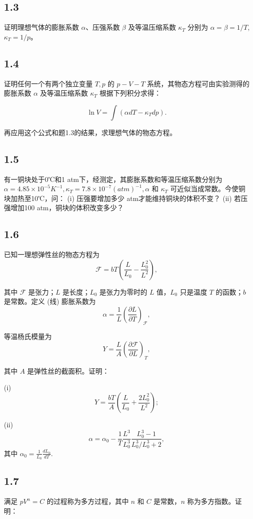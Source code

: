\newpage
\subsection{1.3}
证明理想气体的膨胀系数 $\alpha$、压强系数 $\beta$ 及等温压缩系数 $\kappa_T$ 分别为 $\alpha = \beta = 1/T$, $\kappa_T = 1/p$。

\newpage
\subsection{1.4}
证明任何一个有两个独立变量 $T, p$ 的 $p-V-T$ 系统，其物态方程可由实验测得的膨胀系数 $\alpha$ 及等温压缩系数 $\kappa_T$ 根据下列积分求得：

$$\ln V = \int (\alpha dT - \kappa_T dp).$$

再应用这个公式和题1.3的结果，求理想气体的物态方程。

\newpage
\subsection{1.5}
有一铜块处于0℃和1 atm下，经测定，其膨胀系数和等温压缩系数分别为 $\alpha = 4.85 \times 10^{-5} K^{-1}, \kappa_T = 7.8 \times 10^{-7} (atm)^{-1}, \alpha$ 和 $\kappa_T$ 可近似当成常数。今使铜块加热至10℃，问：
(i) 压强要增加多少 atm才能维持铜块的体积不变？
(ii) 若压强增加100 atm，铜块的体积改变多少？

\newpage
\subsection{1.6}
已知一理想弹性丝的物态方程为
$$\mathcal{F} = bT \left( \frac{L}{L_0} - \frac{L_0^2}{L^2} \right),$$

其中 $\mathcal{F}$ 是张力；$L$ 是长度；$L_0$ 是张力为零时的 $L$ 值，$L_0$ 只是温度 $T$ 的函数；$b$ 是常数。定义 (线) 膨胀系数为
$$\alpha = \frac{1}{L} \left( \frac{\partial L}{\partial T} \right)_\mathcal{F},$$

等温杨氏模量为
$$ Y = \frac{L}{A} \left( \frac{\partial \mathcal{F}}{\partial L} \right)_T, $$

其中 $A$ 是弹性丝的截面积。证明：

(i) $$ Y = \frac{bT}{A} \left( \frac{L}{L_0} + \frac{2L_0^2}{L^2} \right); $$

(ii) $$ \alpha = \alpha_0 - \frac{1}{T} \frac{L^3}{L_0^3} \frac{L_0^3 - 1}{L_0^3 / L_0^3 + 2}, $$ 其中 $\alpha_0 = \frac{1}{L_0} \frac{dL_0}{dT}. $

\newpage
\subsection{1.7}
满足 $pV^n = C$ 的过程称为多方过程，其中 $n$ 和 $C$ 是常数，$n$ 称为多方指数。证明：

